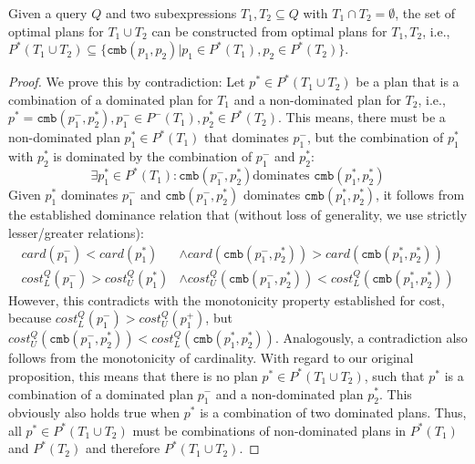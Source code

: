\begin{theorem}
  Given a query $Q$ and two subexpressions $T_1,T_2 \subseteq Q$ with
  $T_1 \cap T_2 = \emptyset$, the set of optimal plans for $T_1 \cup
  T_2$ can be constructed from optimal plans for $T_1,T_2$, i.e.,
  $P^*(T_1 \cup T_2) \subseteq
  \{\mathtt{cmb}(p_1,p_2) | p_1 \in P^*(T_1), p_2 \in P^*(T_2)\}$.
\end{theorem}
\begin{proof}
  We prove this by contradiction: Let $p^* \in P^*(T_1 \cup T_2)$ be a plan that is a combination of a
  dominated plan for $T_1$ and a non-dominated plan for $T_2$, i.e.,
  $p^* = \mathtt{cmb}(p^-_1,p^*_2),p^-_1 \in P^-(T_1),p^*_2 \in
  P^*(T_2)$. This means, there must be a non-dominated plan $p^*_1 \in
  P^*(T_1)$ that dominates $p^-_1$, but the combination of $p^*_1$
  with $p^*_2$ is dominated by the combination of $p^-_1$ and $p^*_2$:
  \[ \exists p^*_1 \in P^*(T_1) : \mathtt{cmb}(p^-_1,p^*_2) \text{
    dominates } \mathtt{cmb}(p^*_1,p^*_2)\] Given $p^*_1$ dominates
  $p^-_1$ and $\mathtt{cmb}(p^-_1,p^*_2)$ dominates
  $\mathtt{cmb}(p^*_1,p^*_2)$, it follows from the established dominance relation that
  (without loss of generality, we use strictly lesser/greater relations):
  \begin{align*}
    card(p^-_1) < card(p^*_1) & \wedge card(\mathtt{cmb}(p^-_1,p^*_2)) > card(\mathtt{cmb}(p^*_1,p^*_2)) \\
    cost^Q_L(p^-_1) > cost^Q_U(p^*_1) & \wedge
    cost^Q_U(\mathtt{cmb}(p^-_1,p^*_2)) <
    cost^Q_L(\mathtt{cmb}(p^*_1,p^*_2))  
  \end{align*}
  However, this contradicts with the monotonicity property established for cost, because $cost^Q_L(p^-_1) >
  cost^Q_U(p^+_1)$, but $cost^Q_U(\mathtt{cmb}(p^-_1,p^*_2)) <
  cost^Q_L(\mathtt{cmb}(p^*_1,p^*_2))$. Analogously, a contradiction also follows from the monotonicity of cardinality. With regard to our original proposition, this means
  that there is no plan $p^* \in P^*(T_1 \cup T_2)$, such that $p^*$
  is a combination of a dominated plan $p^-_1$ and a non-dominated plan
  $p^*_2$. This obviously also holds true when $p^*$ is a combination of two dominated
  plans. Thus, all
  $p^* \in P^*(T_1 \cup T_2)$ must be combinations of non-dominated
  plans in $P^*(T_1)$ and $P^*(T_2)$ and therefore $P^*(T_1 \cup T_2)$.
\end{proof}


